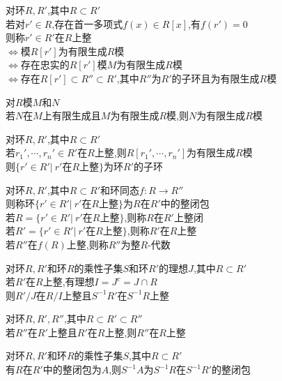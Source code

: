\begin{dingyi}
对环$R,R'$,其中$R\subset R'$\\
若对$r'\in R$,存在首一多项式$f(x)\in R[x]$,有$f(r')=0$\\
则称$r'\in R'$在$R$上整\\
$\Leftrightarrow$模$R[r']$为有限生成$R$模\\
$\Leftrightarrow$存在忠实的$R[r']$模$M$为有限生成$R$模\\
$\Leftrightarrow$存在$R[r']\subset R''\subset R'$,其中$R''$为$R'$的子环且为有限生成$R$模
\end{dingyi}

\begin{dingli}
对$R$模$M$和$N$\\
若$N$在$M$上有限生成且$M$为有限生成$R$模,则$N$为有限生成$R$模
\end{dingli}

\begin{dingli}
对环$R,R'$,其中$R\subset R'$\\
若$r_1',\cdots,r_n'\in R'$在$R$上整,则$R[r_1',\cdots,r_n']$为有限生成$R$模\\
则$\{r'\in R'|\ r'\text{在}R\text{上整}\}$为环$R'$的子环
\end{dingli}

\begin{dingyi}
对环$R,R'$,其中$R\subset R'$和环同态$f:R\to R''$\\
则称环$\{r'\in R'|\ r'\text{在}R\text{上整}\}$为$R$在$R'$中的整闭包\\
若$R=\{r'\in R'|\ r'\text{在}R\text{上整}\}$,则称$R$在$R'$上整闭\\
若$R'=\{r'\in R'|\ r'\text{在}R\text{上整}\}$,则称$R'$在$R$上整\\
若$R''$在$f(R)$上整,则称$R''$为整$R$-代数
\end{dingyi}

\begin{dingli}
对环$R,R'$和环$R$的乘性子集$S$和环$R'$的理想$J$,其中$R\subset R'$\\
若$R'$在$R$上整,有理想$I=J^{c}=J\cap R$\\
则$R'/J$在$R/I$上整且$S^{-1}R'$在$S^{-1}R$上整
\end{dingli}

\begin{dingli}
对环$R,R',R''$,其中$R\subset R'\subset R''$\\
若$R''$在$R'$上整且$R'$在$R$上整,则$R''$在$R$上整
\end{dingli}

\begin{dingli}
对环$R,R'$和环$R$的乘性子集$S$,其中$R\subset R'$\\
有$R$在$R'$中的整闭包为$A$,则$S^{-1}A$为$S^{-1}R$在$S^{-1}R'$的整闭包
\end{dingli}

